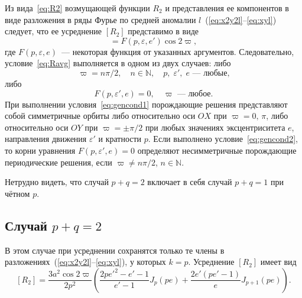 \documentclass[14pt,a4paper%
]{extarticle}
\begin{document}
Из вида~\eqref{eq:R2} возмущающей функции $R_2$ и представления ее компонентов в виде разложения в ряды Фурье по средней аномалии $l$~(\ref{eq:x2y2l}--\ref{eq:xyl}) следует, что ее усреднение $[R_2]$ представимо в виде
\begin{equation}
[R_2]=F\left(p,\varepsilon,e'\right)\cos2\varpi,
\end{equation}
где $F(p,\varepsilon,e)$~--- некоторая функция от указанных аргументов. Следовательно, условие~\eqref{eq:Ravg} выполняется в одном из двух случаев: либо
\begin{equation}\label{eq:gencond1}
\varpi={n\pi}/{2},\quad n\in\mathbb N,\quad p,\;\varepsilon',\;e\text{ --- любые,}
\end{equation}
либо
\begin{equation}\label{eq:gencond2}
F(p,\varepsilon',e)=0,\quad \varpi\text{ --- любое.}
\end{equation}
При выполнении условия~\eqref{eq:gencond1} порождающие решения представляют собой симметричные орбиты либо относительно оси $OX$ при $\varpi=0,\,\pi$, либо относительно оси $OY$ при $\varpi=\pm\pi/2$ при любых значениях эксцентриситета $e$, направления движения $\varepsilon'$ и кратности $p$. Если выполнено условие~\eqref{eq:gencond2}, то корни уравнения $F(p,\varepsilon',e)=0$ определяют несимметричные порождающие периодические решения, если $\varpi\neq n\pi/2$, $n\in\mathbb N$.

Нетрудно видеть, что случай $p+q=2$ включает в себя случай $p+q=1$ при чётном $p$.



\subsection*{Случай $p+q=2$}
В этом случае при усреднении сохранятся только те члены в разложениях~(\ref{eq:x2y2l}--\ref{eq:xyl}), у которых $k=p$. Усреднение $[R_2]$ имеет вид
\begin{equation}
[R_2]=\frac{3a^2\cos2\varpi}{2p^2}\left(\frac{2p{e'}^2-e'-1}{e'-1}J_p(pe)+\frac{2e'(pe'-1)}e J_{p+1}(pe)\right).
\end{equation}
\end{document}
